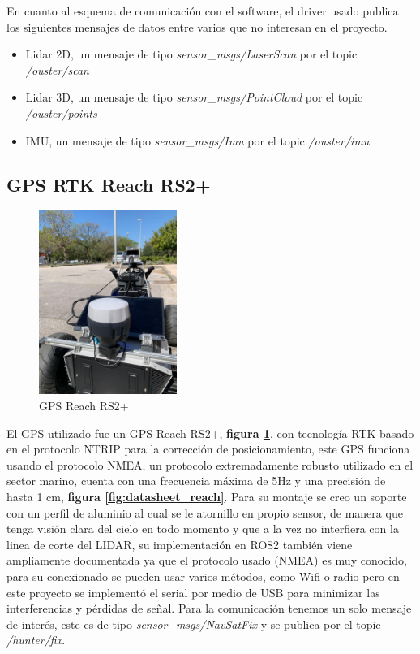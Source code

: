 En cuanto al esquema de comunicación con el software, el driver usado publica los siguientes mensajes de datos entre varios que no interesan en el   proyecto.
\begin{itemize}
    \item Lidar 2D, un mensaje de tipo \textit{sensor\_msgs/LaserScan} por el topic \textit{/ouster/scan}
    \item Lidar 3D, un mensaje de tipo \textit{sensor\_msgs/PointCloud} por el topic \textit{/ouster/points}
    \item IMU, un mensaje de tipo \textit{sensor\_msgs/Imu} por el topic \textit{/ouster/imu}
\end{itemize}

\subsection{GPS RTK Reach RS2+}


\begin{figure}[H]
    \centering
    \includegraphics[width=0.4\textwidth]{images/reach_rs2.jpeg}
    \caption{GPS Reach RS2+}
    \label{fig:reach_rs2}
\end{figure}

El GPS utilizado fue un GPS Reach RS2+, \textbf{figura \ref{fig:reach_rs2}}, con tecnología RTK basado en el protocolo NTRIP para la 
corrección de posicionamiento, este GPS funciona usando el protocolo NMEA, un protocolo extremadamente robusto utilizado en el sector marino, 
cuenta con una frecuencia máxima de 5Hz y una precisión de hasta 1 cm, \textbf{figura \ref{fig:datasheet_reach}}. Para su montaje se creo un soporte con un perfil de aluminio al cual 
se le atornillo en propio sensor, de manera que tenga visión clara del cielo en todo momento y que a la vez no interfiera con la linea de 
corte del LIDAR, su implementación en ROS2 también viene ampliamente documentada ya que el protocolo usado (NMEA) es muy conocido, 
para su conexionado se pueden usar varios métodos, como Wifi o radio pero en este proyecto se implementó el serial por medio de USB para 
minimizar las interferencias y pérdidas de señal. Para la comunicación tenemos un solo mensaje de interés, este es de tipo \textit{sensor\_msgs/NavSatFix} 
y se publica por el topic \textit{/hunter/fix}.

